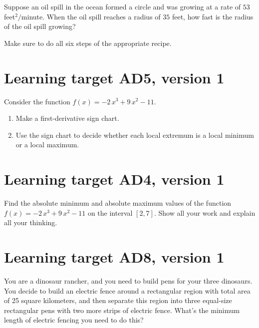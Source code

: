 Suppose an oil spill in the ocean formed a circle and was growing at a rate of \(53\) feet\(^2/\)minute. When the oil spill reaches a radius of \(35\) feet, how fast is the radius of the oil spill growing? 

\vspace{1em}

Make sure to do all six steps of the appropriate recipe.

\pagebreak

\section{Learning target AD5, version 1}

Consider the function \(f(x)=-2 \, x^{3} + 9 \, x^{2} - 11\).

\begin{enumerate}[leftmargin=0pt]
    \item Make a first-derivative sign chart.
    \vfill

    \item Use the sign chart to decide whether each local extremum is a local minimum or a local maximum.
    \vfill
\end{enumerate}

\pagebreak

\section{Learning target AD4, version 1}

Find the absolute minimum and absolute maximum values of the function \(f(x)=-2 \, x^{3} + 9 \, x^{2} - 11\) on the interval \([2,7]\). Show all your work and explain all your thinking.

\pagebreak

\section{Learning target AD8, version 1}

You are a dinosaur rancher, and you need to build pens for your three dinosaurs. You decide to build an electric fence around a rectangular region with total area of 25 square kilometers, and then separate this region into three equal-size rectangular pens with two more strips of electric fence. What's the minimum length of electric fencing you need to do this? 

